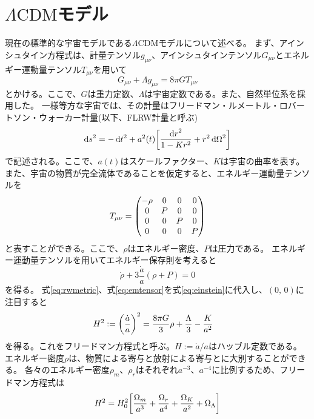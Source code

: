 \documentclass[../../main.tex]{subfiles}
\begin{document}
\section{$\Lambda\mathrm{CDM}$モデル}
現在の標準的な宇宙モデルである$\Lambda\mathrm{CDM}$モデルについて述べる。
まず、アインシュタイン方程式は、計量テンソル$g_{\mu\nu}$、アインシュタインテンソル$G_{\mu\nu}$とエネルギー運動量テンソル$T_{\mu\nu}$を用いて
\begin{equation}
    \label{eq:einstein}
    G_{\mu\nu}+\Lambda g_{\mu\nu}=8\pi GT_{\mu\nu}
\end{equation}
とかける。ここで、$G$は重力定数、$\Lambda$は宇宙定数である。また、自然単位系を採用した。
一様等方な宇宙では、その計量はフリードマン・ルメートル・ロバートソン・ウォーカー計量(以下、FLRW計量と呼ぶ)
\begin{equation}
    \label{eq:rwmetric}
    \dd{s}^2=-\dd{t}^2+a^2(t)\qty[\frac{\dd{r}^2}{1-Kr^2}+r^2\dd{\Omega}^2]
\end{equation}
で記述される。ここで、$a(t)$はスケールファクター、$K$は宇宙の曲率を表す。
また、宇宙の物質が完全流体であることを仮定すると、エネルギー運動量テンソルを
\begin{equation}
    \label{eq:emtensor}
    T_{\mu\nu}=\mqty(-\rho&0&0&0\\0&P&0&0\\0&0&P&0\\0&0&0&P)
\end{equation}
と表すことができる。ここで、$\rho$はエネルギー密度、$P$は圧力である。
エネルギー運動量テンソルを用いてエネルギー保存則を考えると
\begin{equation}
    \label{eq:energyconservation}
    \dot{\rho}+3\dfrac{\dot{a}}{a}(\rho+P)=0
\end{equation}
を得る。
式\eqref{eq:rwmetric}、式\eqref{eq:emtensor}を式\eqref{eq:einstein}に代入し、$(0,\,0)$に注目すると
\begin{align}
    \label{eq:friedmann}
    H^2:=\qty(\dfrac{\dot{a}}{a})^2 &= \dfrac{8\pi G}{3}\rho+\dfrac{\Lambda}{3}-\dfrac{K}{a^2}
\end{align}
を得る。これをフリードマン方程式と呼ぶ。$H:=\dot{a}/a$はハッブル定数である。
エネルギー密度$\rho$は、物質による寄与と放射による寄与とに大別することができる。
各々のエネルギー密度$\rho_m$、$\rho_r$はそれぞれ$a^{-3}$、$a^{-4}$に比例するため、フリードマン方程式は
\begin{equation}
    \label{eq:friedmann2}
    H^2=H_0^2\qty[\dfrac{\Omega_m}{a^3}+\dfrac{\Omega_r}{a^4}+\dfrac{\Omega_{K}}{a^2}+\Omega_{\Lambda}]
\end{equation}
\end{document}

